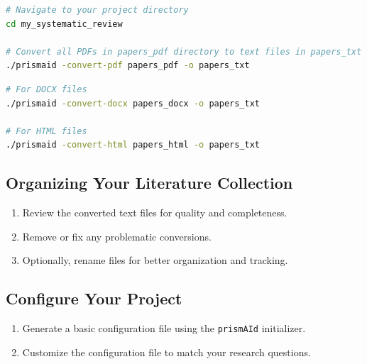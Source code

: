 \begin{commandbox}
\begin{lstlisting}[language=Bash]
# Navigate to your project directory
cd my_systematic_review

# Convert all PDFs in papers_pdf directory to text files in papers_txt
./prismaid -convert-pdf papers_pdf -o papers_txt
\end{lstlisting}
\end{commandbox}

\begin{commandbox}
\begin{lstlisting}[language=Bash]
# For DOCX files
./prismaid -convert-docx papers_docx -o papers_txt

# For HTML files
./prismaid -convert-html papers_html -o papers_txt
\end{lstlisting}
\end{commandbox}

\subsection{Organizing Your Literature Collection}

\begin{enumerate}
    \item Review the converted text files for quality and completeness.
    \item Remove or fix any problematic conversions.
    \item Optionally, rename files for better organization and tracking.
\end{enumerate}


\subsection{Configure Your Project}

\begin{enumerate}
    \item Generate a basic configuration file using the \texttt{prismAId} initializer.
    \item Customize the configuration file to match your research questions.
\end{enumerate}

